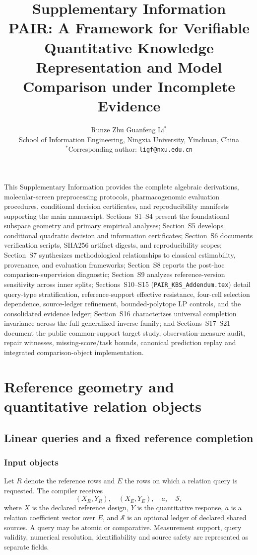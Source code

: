 \documentclass[11pt]{article}
\title{\textbf{Supplementary Information}\\[0.6em]\large PAIR: A Framework for Verifiable Quantitative Knowledge Representation and Model Comparison under Incomplete Evidence}
\author{Runze Zhu \quad Guanfeng Li$^{*}$\\[0.4em]
\small School of Information Engineering, Ningxia University, Yinchuan, China\\[0.25em]
\small $^{*}$Corresponding author: \texttt{ligf@nxu.edu.cn}}
\date{}
\begin{document}
\maketitle
\noindent This Supplementary Information provides the complete algebraic derivations, molecular-screen preprocessing protocols, pharmacogenomic evaluation procedures, conditional decision certificates, and reproducibility manifests supporting the main manuscript. Sections~S1--S4 present the foundational subspace geometry and primary empirical analyses; Section~S5 develops conditional quadratic decision and information certificates; Section~S6 documents verification scripts, SHA256 artifact digests, and reproducibility scopes; Section~S7 synthesizes methodological relationships to classical estimability, provenance, and evaluation frameworks; Section~S8 reports the post-hoc comparison-supervision diagnostic; Section~S9 analyzes reference-version sensitivity across inner splits; Sections~S10--S15 (\texttt{PAIR\_KBS\_Addendum.tex}) detail query-type stratification, reference-support effective resistance, four-cell selection dependence, source-ledger refinement, bounded-polytope LP controls, and the consolidated evidence ledger; Section~S16 characterizes universal completion invariance across the full generalized-inverse family; and Sections~S17--S21 document the public common-support target study, observation-measure audit, repair witnesses, missing-score/task bounds, canonical prediction replay and integrated comparison-object implementation.

\begingroup\small{}\setlength{\cftbeforesecskip}{0pt}
\tableofcontents\endgroup
\clearpage

\section{Reference geometry and quantitative relation objects}


\subsection{Linear queries and a fixed reference completion}
\subsubsection{Input objects}
Let $R$ denote the reference rows and $E$ the rows on which a relation query is requested. The compiler receives
\[
(X_R,Y_R),\quad (X_E,Y_E),\quad a,\quad \mathcal S,
\]
where $X$ is the declared reference design, $Y$ is the quantitative response, $a$ is a relation coefficient vector over $E$, and $\mathcal S$ is an optional ledger of declared shared sources. A query may be atomic or comparative. Measurement support, query validity, numerical resolution, identifiability and source safety are represented as separate fields.
\end{document}
